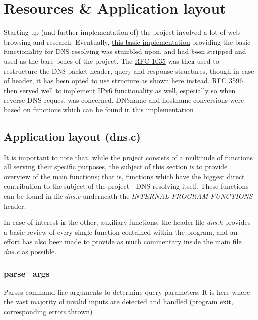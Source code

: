 \documentclass[a4paper, 11pt]{article}
\begin{document}
	\newpage
	\section{Resources \& Application layout}
	Starting up (and further implementation of) the project involved a lot of web browsing and research. 
	Eventually, \href{https://www.binarytides.com/dns-query-code-in-c-with-linux-sockets/}{this basic implementation}
	\cite{article1} providing the basic functionality for DNS resolving was stumbled upon, and had been stripped and 
	used as the bare bones of the project. The \href{https://datatracker.ietf.org/doc/html/rfc1035}{RFC 1035}\cite{rfc1035} 
	was then used to restructure the DNS packet header, query and response structures, though in case of 
	header, it has been opted to use structure as shown \href{https://www.freesoft.org/CIE/RFC/2065/40.htm}{here}\cite{rfc2065} 
	instead. \href{https://datatracker.ietf.org/doc/html/rfc3596}{RFC 3596}\cite{rfc3596} then served well to implement 
	IPv6 functionality as well, especially so when reverse DNS request was concerned. DNSname and hostname conversions 
	were based on functions which can be found in \href{https://github.com/riveraj/dns-resolver/blob/master/main.c}{this implementation}
	\cite{article2}
	\subsection{Application layout (dns.c)}
	It is important to note that, while the project consists of a multitude of functions all serving their specific 
	purposes, the subject of this section is to provide overview of the main functions; that is, functions 
	which have the biggest direct contribution to the subject of the project---DNS resolving itself. These 
	functions can be found in file \textit{dns.c} underneath the \textit{INTERNAL PROGRAM FUNCTIONS} header.
	
	In case of interest in the other, auxiliary functions, the header file \textit{dns.h} provides a basic review 
	of every single function contained within the program, and an effort has also been made to provide 
	as much commentary inside the main file \textit{dns.c} as possible.

	\subsubsection{parse\_args}
	\noindent Parses command-line arguments to determine query parameters. It is here where the vast majority of invalid 
	inputs are detected and handled (program exit, corresponding errors thrown)
\end{document}
